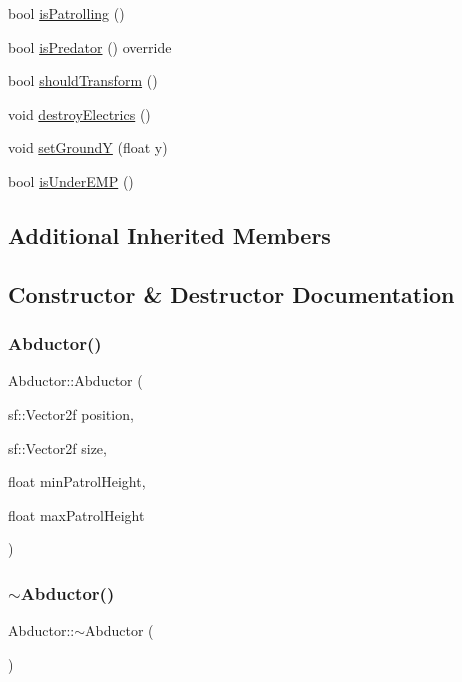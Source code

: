 \begin{DoxyCompactItemize}
bool \hyperlink{class_abductor_a76abe6a51994ef35787351c9cd49ba6c}{is\+Patrolling} ()
\item 
bool \hyperlink{class_abductor_ab862b53793f2722546e3e1be05bd546e}{is\+Predator} () override
\item 
bool \hyperlink{class_abductor_af50d368af0d068122b2755a238bebfb7}{should\+Transform} ()
\item 
void \hyperlink{class_abductor_a7a37f57eb3c873e8b944b4757d1d87cd}{destroy\+Electrics} ()
\item 
void \hyperlink{class_abductor_a8be0f01a614756f913acf032fa64f474}{set\+GroundY} (float y)
\item 
bool \hyperlink{class_abductor_ab54e8bd43da87e3328ccaab48cbc79bb}{is\+Under\+E\+MP} ()
\end{DoxyCompactItemize}
\subsection*{Additional Inherited Members}


\subsection{Constructor \& Destructor Documentation}
\hypertarget{class_abductor_ae0d55b9a8e855c02fe51fbb48613a4b7}{}\label{class_abductor_ae0d55b9a8e855c02fe51fbb48613a4b7} 
\subsubsection{\texorpdfstring{Abductor()}{Abductor()}}
{\footnotesize\ttfamily Abductor\+::\+Abductor (\begin{DoxyParamCaption}\item[{sf\+::\+Vector2f}]{position,  }\item[{sf\+::\+Vector2f}]{size,  }\item[{float}]{min\+Patrol\+Height,  }\item[{float}]{max\+Patrol\+Height }\end{DoxyParamCaption})}

\hypertarget{class_abductor_adc657b211a1b36c55db079caa10d9010}{}\label{class_abductor_adc657b211a1b36c55db079caa10d9010} 
\subsubsection{\texorpdfstring{$\sim$\+Abductor()}{~Abductor()}}
{\footnotesize\ttfamily Abductor\+::$\sim$\+Abductor (\begin{DoxyParamCaption}{ }\end{DoxyParamCaption})\hspace{0.3cm}{\ttfamily [virtual]}}



